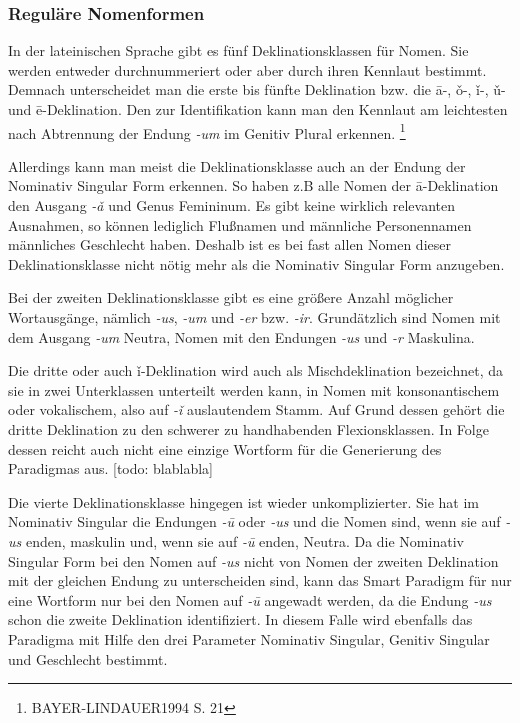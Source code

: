 \documentclass[12pt,abstract=on]{scrreprt}
\begin{document}
\subsubsection{Reguläre Nomenformen}
In der lateinischen Sprache gibt es fünf Deklinationsklassen für Nomen. Sie werden entweder durchnummeriert oder aber durch ihren Kennlaut bestimmt. Demnach unterscheidet man die erste bis fünfte Deklination bzw. die ā-, ǒ-, ǐ-, ǔ- und ē-Deklination. Den zur Identifikation kann man den Kennlaut am leichtesten nach Abtrennung der Endung \textit{-um} im Genitiv Plural erkennen. \footnote{BAYER-LINDAUER1994 S. 21}\par
Allerdings kann man meist die Deklinationsklasse auch an der Endung der Nominativ Singular Form erkennen. So haben z.B alle Nomen der ā-Deklination den Ausgang \textit{-ǎ} und Genus Femininum. Es gibt keine wirklich relevanten Ausnahmen, so können lediglich Flußnamen und männliche Personennamen männliches Geschlecht haben. Deshalb ist es bei fast allen Nomen dieser Deklinationsklasse nicht nötig mehr als die Nominativ Singular Form anzugeben. \par
Bei der zweiten Deklinationsklasse gibt es eine größere Anzahl möglicher Wortausgänge, nämlich \textit{-us}, \textit{-um} und \textit{-er} bzw. \textit{-ir}. Grundätzlich sind Nomen mit dem Ausgang \textit{-um} Neutra, Nomen mit den Endungen \textit{-us} und \textit{-r} Maskulina. \par
Die dritte oder auch ǐ-Deklination wird auch als Mischdeklination bezeichnet, da sie in zwei Unterklassen unterteilt werden kann, in Nomen mit konsonantischem oder vokalischem, also auf \textit{-ǐ} auslautendem Stamm. Auf Grund dessen gehört die dritte Deklination zu den schwerer zu handhabenden Flexionsklassen. In Folge dessen reicht auch nicht eine einzige Wortform für die Generierung des Paradigmas aus. [todo: blablabla] \par
Die vierte Deklinationsklasse hingegen ist wieder unkomplizierter. Sie hat im Nominativ Singular die Endungen \textit{-ū} oder \textit{-us} und die Nomen sind, wenn sie auf \textit{-us} enden, maskulin und, wenn sie auf \textit{-ū} enden, Neutra. Da die Nominativ Singular Form bei den Nomen auf \textit{-us} nicht von Nomen der zweiten Deklination mit der gleichen Endung zu unterscheiden sind, kann das Smart Paradigm für nur eine Wortform nur bei den Nomen auf \textit{-ū} angewadt werden, da die Endung \textit{-us} schon die zweite Deklination identifiziert. In diesem Falle wird ebenfalls das Paradigma mit Hilfe den drei Parameter Nominativ Singular, Genitiv Singular und Geschlecht bestimmt. \par
\end{document}
